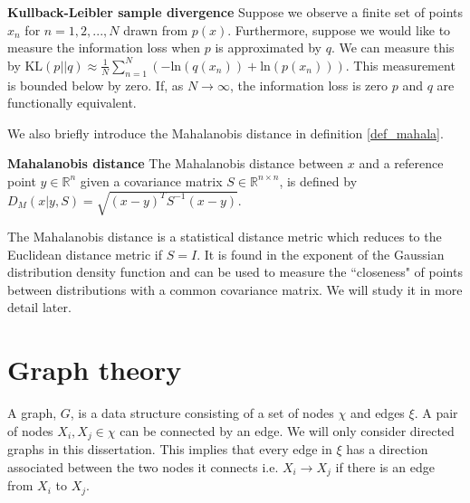 \begin{thrm}
\textbf{Kullback-Leibler sample divergence} Suppose we observe a finite set of points $x_n$ for $n=1,2,..., N$ drawn from $p(x)$. Furthermore, suppose we would like to measure the information loss when $p$ is approximated by $q$. We can measure this by $\text{KL}(p||q) \approx \frac{1}{N}\sum_{n=1}^N\left(-\text{ln}(q(x_n)) + \text{ln}(p(x_n))\right)$. This measurement is bounded below by zero. If, as $N \rightarrow \infty$, the information loss is zero $p$ and $q$ are functionally equivalent.
\label{thrm_kl_sample}
\end{thrm}
We also briefly introduce the Mahalanobis distance in definition \ref{def_mahala}.
\begin{defn}
\textbf{Mahalanobis distance} The Mahalanobis distance between $x$ and a reference point $y \in \mathbb{R}^n$ given a covariance matrix $S \in \mathbb{R}^{n\times
n}$, is defined by $D_M(x|y, S) = \sqrt{(x-y)^TS^{-1}(x-y)}$. 
\label{def_mahala}
\end{defn}
The Mahalanobis distance is a statistical distance metric which reduces to the Euclidean distance metric if $S=I$. It is found in the exponent of the Gaussian distribution density function and can be used to measure the ``closeness" of points between distributions with a common covariance matrix. We will study it in more detail later.
\section{Graph theory}
\label{sec_graph_theory}
A graph, $G$, is a data structure consisting of a set of nodes $\chi$ and edges $\xi$. A pair of nodes $X_i, X_j \in \chi$ can be connected by an edge. We will only consider directed graphs in this dissertation. This implies that every edge in $\xi$ has a direction associated between the two nodes it connects i.e. $X_i \rightarrow X_j$ if there is an edge from $X_i$ to $X_j$.

